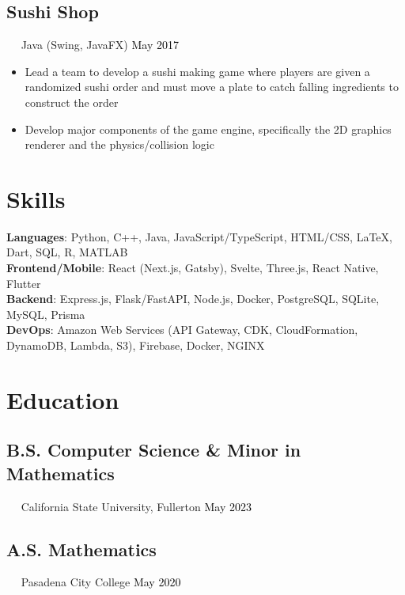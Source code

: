 \documentclass{article}
\newcommand{\resumesection}[3]{
    \subsection*{#1}
    \ 
    \ 
    \small
    \textcolor{csufgrey}{#2}
    \normalsize
    \hfill
    \textcolor{black}{#3}
    \normalsize
}
\begin{document}
\resumesection{Sushi Shop}{Java (Swing, JavaFX)}{May 2017}
\begin{itemize}
    \item Lead a team to develop a sushi making game where players are given a randomized sushi order and must move a plate to catch falling ingredients to construct the order
    \item Develop major components of the game engine, specifically the 2D graphics renderer and the physics/collision logic
\end{itemize}
\section*{Skills}
\textbf{Languages}: Python, C++, Java, JavaScript/TypeScript, HTML/CSS, {\selectfont\LaTeX}, Dart, SQL, R, MATLAB\\
\textbf{Frontend/Mobile}: React (Next.js, Gatsby), Svelte, Three.js, React Native, Flutter\\
\textbf{Backend}: Express.js, Flask/FastAPI, Node.js, Docker, PostgreSQL, SQLite, MySQL, Prisma\\
\textbf{DevOps}: Amazon Web Services (API Gateway, CDK, CloudFormation, DynamoDB, Lambda, S3), Firebase, Docker, NGINX
\section*{Education}
\resumesection{B.S. Computer Science \& Minor in Mathematics}{California State University, Fullerton}{May 2023}%
\resumesection{A.S. Mathematics}{Pasadena City College}{May 2020}
\end{document}
